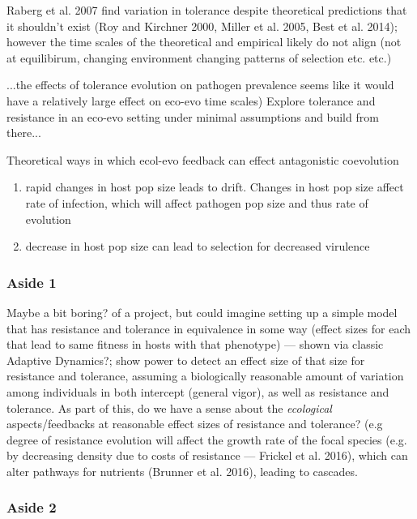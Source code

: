 \documentclass{article}
\begin{document}
Raberg et al. 2007 find variation in tolerance despite theoretical predictions that it shouldn't exist (Roy and Kirchner 2000, Miller et al. 2005, Best et al. 2014); however the time scales of the theoretical and empirical likely do not align (not at equilibirum, changing environment changing patterns of selection etc. etc.)

...the effects of tolerance evolution on pathogen prevalence seems like it would have a relatively large effect on eco-evo time scales) Explore tolerance and resistance in an eco-evo setting under minimal assumptions and build from there... 

Theoretical ways in which ecol-evo feedback can effect antagonistic coevolution
\begin{enumerate}
    \item rapid changes in host pop size leads to drift. Changes in host pop size affect rate of infection, which will affect pathogen pop size and thus rate of evolution
    \item decrease in host pop size can lead to selection for decreased virulence
\end{enumerate}

\subsubsection*{Aside 1}

Maybe a bit boring? of a project, but could imagine setting up a simple model that has resistance and tolerance in equivalence in some way (effect sizes for each that lead to same fitness in hosts with that phenotype) --- shown via classic Adaptive Dynamics?; show power to detect an effect size of that size for resistance and tolerance, assuming a biologically reasonable amount of variation among individuals in both intercept (general vigor), as well as resistance and tolerance. As part of this, do we have a sense about the \emph{ecological} aspects/feedbacks at reasonable effect sizes of resistance and tolerance? (e.g degree of resistance evolution will affect the growth rate of the focal species (e.g. by decreasing density due to costs of resistance --- Frickel et al. 2016), which can alter pathways for nutrients (Brunner et al. 2016), leading to cascades.

\subsubsection*{Aside 2}
\end{document}
